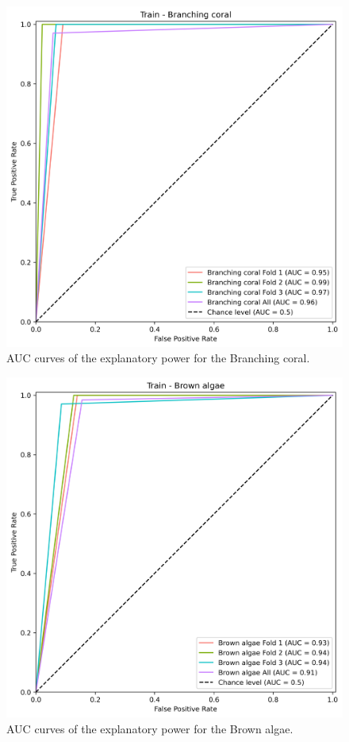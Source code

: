 \begin{figure}
\hypertarget{fig:chap3figS8}{%
\centering
\includegraphics{03-Chapitre3/figures/supplementary/03-receiver_operator_curve_train_rf_Branching coral.png}
\caption{AUC curves of the explanatory power for the Branching
coral.}\label{fig:chap3figS8}
}
\end{figure}

\begin{figure}
\hypertarget{fig:chap3figS9}{%
\centering
\includegraphics{03-Chapitre3/figures/supplementary/03-receiver_operator_curve_train_rf_Brown algae.png}
\caption{AUC curves of the explanatory power for the Brown
algae.}\label{fig:chap3figS9}
}
\end{figure}

